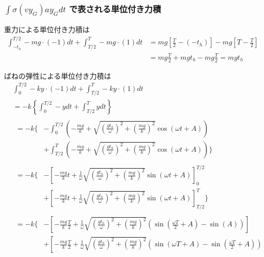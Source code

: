 \documentclass[a4paper,11pt]{jsarticle}
\begin{document}
\subsubsection{$\int\sigma (vy_G)ay_G dt$ で表される単位付き力積}
重力による単位付き力積は
\begin{align}
  \int_{-t_h}^{T/2} -mg \cdot (-1) dt
  + \int_{T/2}^{T} -mg \cdot (1) dt
   & = mg\left[ \frac{T}{2} - (-t_h) \right] - mg \left[ T - \frac{T}{2} \right]
  \\
   & = mg\frac{T}{2} + mgt_h - mg\frac{T}{2} = mgt_h
\end{align}

ばねの弾性による単位付き力積は
\begin{align}
   & \int_{0}^{T/2} -ky \cdot (-1) dt
  + \int_{T/2}^{T} -ky \cdot (1) dt
  \\
   & = -k \left\{
  \int_{0}^{T/2} -y dt + \int_{T/2}^{T} y dt
  \right\}
  \\
   &
  \begin{aligned}
    = -k \Bigg\{
     & - \int_{0}^{T/2} \left(
    -\frac{mg}{k} + \sqrt{\left(\frac{gt_h}{\omega}\right)^2 + \left(\frac{mg}{k}\right)^2}\cos \left( \omega t + A \right)
    \right)
    \\
     & + \int_{T/2}^{T} \left(
    -\frac{mg}{k} + \sqrt{\left(\frac{gt_h}{\omega}\right)^2 + \left(\frac{mg}{k}\right)^2}\cos \left( \omega t + A \right)
    \right) \Bigg\}
  \end{aligned}
  \\
   & \begin{aligned}
       = -k \Bigg\{
        & - \left[
         -\frac{mg}{k}t + \frac{1}{\omega} \sqrt{\left(\frac{gt_h}{\omega}\right)^2 + \left(\frac{mg}{k}\right)^2} \sin (\omega t + A)
         \right]_0^{T/2}
       \\
        & + \left[
         -\frac{mg}{k}t + \frac{1}{\omega} \sqrt{\left(\frac{gt_h}{\omega}\right)^2 + \left(\frac{mg}{k}\right)^2} \sin (\omega t + A)
         \right]_{T/2}^T
       \Bigg\}
     \end{aligned}
  \\
   & \begin{aligned}
       = -k \Bigg\{
        & - \left[
         -\frac{mg}{k}\frac{T}{2} + \frac{1}{\omega} \sqrt{\left(\frac{gt_h}{\omega}\right)^2 + \left(\frac{mg}{k}\right)^2} (\sin(\frac{\omega T}{2} + A) - \sin(A))
         \right]
       \\
        & + \left[
         -\frac{mg}{k}\frac{T}{2} + \frac{1}{\omega} \sqrt{\left(\frac{gt_h}{\omega}\right)^2 + \left(\frac{mg}{k}\right)^2} (\sin(\omega T + A) - \sin(\frac{\omega T}{2} + A))

\end{aligned}
\end{align}
\end{document}
